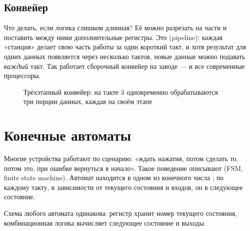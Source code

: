 \subsection{Конвейер}

Что делать, если логика слишком длинная? Её можно разрезать на части и
поставить между ними дополнительные регистры. Это 
(pipeline): каждая «станция» делает свою часть работы за один короткий такт,
и хотя результат для одних данных появляется через несколько тактов, новые
данные можно подавать \emph{каждый} такт. Так работает сборочный конвейер на
заводе --- и все современные процессоры.

\begin{figure}[H]
\centering
{}
\caption{Трёхэтапный конвейер: на такте 3 одновременно обрабатываются три
порции данных, каждая на своём этапе}
\end{figure}

\section{Конечные автоматы}

Многие устройства работают по сценарию: «ждать нажатия, потом сделать то, потом
это, при ошибке вернуться в начало». Такое поведение описывают
 (FSM, finite state machine). Автомат находится в
одном из конечного числа ; по каждому такту, в зависимости от
текущего состояния и входов, он  в следующее состояние.

Схема любого автомата одинакова: регистр хранит номер текущего состояния,
комбинационная логика вычисляет следующее состояние и выходы.

